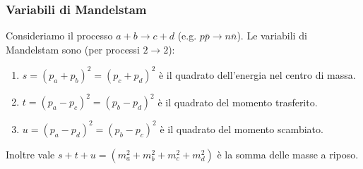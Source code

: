 \subsubsection{Variabili di Mandelstam}
Consideriamo il processo $a+b\to c+d$ (e.g. $p\bar p\to n\bar n$). Le variabili di Mandelstam sono (per processi $2\to2$):
\begin{enumerate}
    \item $s=(p_a+p_b)^2=(p_c+p_d)^2$ è il quadrato dell'energia nel centro di massa.
    \item $t=(p_a-p_c)^2=(p_b-p_d)^2$ è il quadrato del momento trasferito.
    \item $u=(p_a-p_d)^2=(p_b-p_c)^2$ è il quadrato del momento scambiato.
\end{enumerate}
Inoltre vale $s+t+u=(m_a^2+m_b^2+m_c^2+m_d^2)$ è la somma delle masse a riposo.
